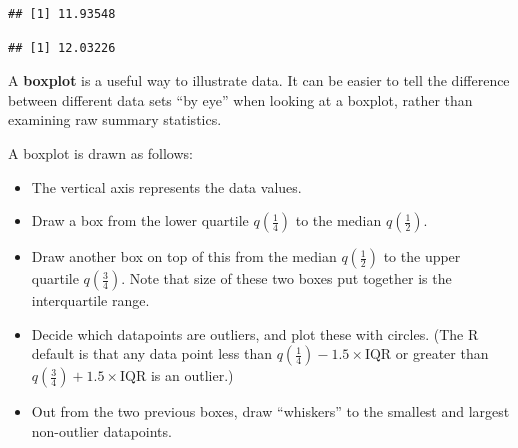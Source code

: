 \documentclass[
  a4paper,
]{book}
\newenvironment{Shaded}{\begin{snugshade}}{\end{snugshade}}
\newcommand{\FunctionTok}[1]{\textcolor[rgb]{0.00,0.00,0.00}{#1}}
\newcommand{\NormalTok}[1]{#1}
\newcommand{\SpecialCharTok}[1]{\textcolor[rgb]{0.00,0.00,0.00}{#1}}
\providecommand{\tightlist}{%
  \setlength{\itemsep}{0pt}\setlength{\parskip}{0pt}}
\theoremstyle{definition}
\theoremstyle{definition}
\theoremstyle{definition}
\theoremstyle{definition}
\theoremstyle{remark}
\begin{document}
\begin{verbatim}
## [1] 11.93548
\end{verbatim}

\begin{Shaded}
\end{Shaded}

\begin{verbatim}
## [1] 12.03226
\end{verbatim}

A \textbf{boxplot} is a useful way to illustrate data. It can be easier to tell the difference between different data sets ``by eye'' when looking at a boxplot, rather than examining raw summary statistics.

A boxplot is drawn as follows:

\begin{itemize}
\tightlist
\item
  The vertical axis represents the data values.
\item
  Draw a box from the lower quartile \(q(\frac14)\) to the median \(q(\frac12)\).
\item
  Draw another box on top of this from the median \(q(\frac12)\) to the upper quartile \(q(\frac34)\). Note that size of these two boxes put together is the interquartile range.
\item
  Decide which datapoints are outliers, and plot these with circles. (The R default is that any data point less than \(q(\frac14) - 1.5 \times \text{IQR}\) or greater than \(q(\frac34) + 1.5 \times \text{IQR}\) is an outlier.)
\item
  Out from the two previous boxes, draw ``whiskers'' to the smallest and largest non-outlier datapoints.
\end{itemize}
\end{document}
